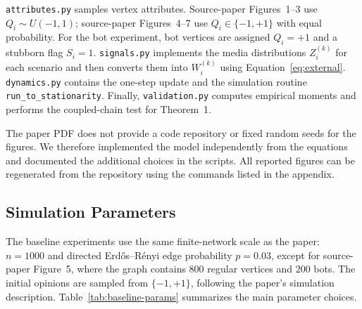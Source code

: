 \documentclass[11pt]{article}
\begin{document}
\texttt{attributes.py} samples vertex attributes.  Source-paper
Figures~1--3 use $Q_i\sim U(-1,1)$; source-paper Figures~4--7 use
$Q_i\in\{-1,+1\}$ with equal probability.
For the bot experiment, bot vertices are assigned $Q_i=+1$ and a stubborn flag
$S_i=1$.  \texttt{signals.py} implements the media distributions $Z_i^{(k)}$
for each scenario and then converts them into $W_i^{(k)}$ using
Equation~\eqref{eq:external}.  \texttt{dynamics.py} contains the one-step update
and the simulation routine \texttt{run\_to\_stationarity}.  Finally,
\texttt{validation.py} computes empirical moments and performs the coupled-chain
test for Theorem~1.

The paper PDF does not provide a code repository or fixed random seeds for the
figures.  We therefore implemented the model independently from the equations
and documented the additional choices in the scripts.  All reported figures can
be regenerated from the repository using the commands listed in the appendix.

\subsection{Simulation Parameters}

The baseline experiments use the same finite-network scale as the paper:
$n=1000$ and directed Erd\H{o}s--R\'enyi edge probability $p=0.03$, except for
source-paper Figure~5, where the graph contains $800$ regular vertices and
$200$ bots.  The initial opinions are sampled from $\{-1,+1\}$, following the
paper's simulation description.  Table~\ref{tab:baseline-params} summarizes the
main parameter choices.

\begin{table}[t]
\centering
{}
\caption{Baseline simulation settings.  The no-memory cases rescale $c$ and
$d$ proportionally so that $c+d=1$, matching the comparison used in the source
paper.}
\label{tab:baseline-params}
\end{table}
\end{document}
